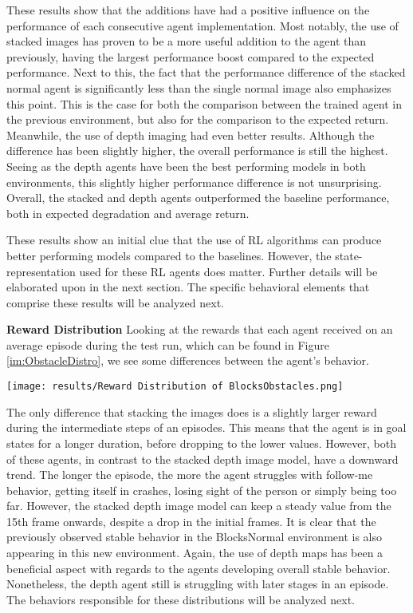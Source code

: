 These results show that the additions have had a positive influence on the 
performance of each consecutive agent implementation. Most notably, the use of stacked 
images has proven to be a more useful addition to the agent than previously, having 
the largest performance boost compared to the expected performance. Next to this, the 
fact that the performance difference of the stacked normal agent is significantly less than 
the single normal image also emphasizes this point. This is 
the case for both the comparison between the trained agent in the previous environment, 
but also for the comparison to the expected return. Meanwhile, the 
use of depth imaging had even better results. Although the difference has been slightly higher, 
the overall performance is still the highest. Seeing as the depth agents have been the best 
performing models in both environments, this slightly higher performance difference is not unsurprising. 
Overall, the stacked and depth agents outperformed the baseline performance, both 
in expected degradation and average return. 

These results show an initial clue that the use of 
RL algorithms can produce better performing models compared to the baselines. However, 
the state-representation used for these RL agents does matter. Further details will 
be elaborated upon in the next section. The specific behavioral elements that comprise these 
results will be analyzed next.  \newline

\noindent
\textbf{Reward Distribution} \newline
Looking at the rewards that each agent received on an average episode during 
the test run, which can be found in Figure \ref{im:ObstacleDistro}, we see some differences 
between the agent's behavior. 

\begin{Figure}
    \centering
    \texttt{[image: results/Reward Distribution of BlocksObstacles.png]}
    \label{im:ObstacleDistro}
\end{Figure}

The only difference that stacking the 
images does is a slightly larger reward during the intermediate steps of an 
episodes. This means that the agent is in goal states for a longer duration, before 
dropping to the lower values. However, both of these agents, in contrast to the stacked 
depth image model, have a downward trend. The longer the episode, the more 
the agent struggles with follow-me behavior, getting itself in crashes, losing 
sight of the person or simply being too far. However, the stacked depth image model can 
keep a steady value from the 15th frame onwards, despite a drop in the initial frames. 
It is clear that the previously observed stable behavior in the BlocksNormal environment 
is also appearing in this new environment. Again, the use of 
depth maps has been a beneficial aspect with regards to the agents developing overall 
stable behavior. Nonetheless, the 
depth agent still is struggling with later stages in an episode. The behaviors responsible 
for these distributions will be analyzed next.\newline

